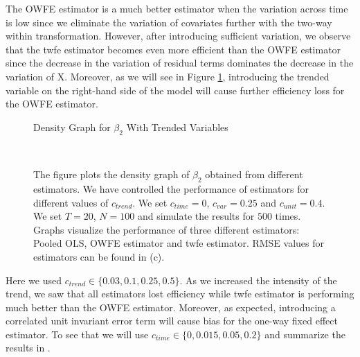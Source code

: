 \documentclass[12pt, a4paper]{article}
\begin{document}
The \ac{OWFE} estimator is a much better estimator when the variation
across time is low since we eliminate the variation of covariates
further with the two-way within transformation.
However, after introducing sufficient variation, we observe that the \ac{twfe} estimator becomes even more
efficient than the \ac{OWFE} estimator since the decrease in the variation of residual terms dominates the decrease in the variation of X. Moreover, as we will see in Figure \ref{fig:c3},
introducing the trended variable on the right-hand side of the model will cause further efficiency loss for the \ac{OWFE} estimator.
\begin{figure}[t]
    \caption{Density Graph for $\beta_2$ With Trended Variables}
     \\
    \caption*{\scriptsize{The figure plots the density graph of $\beta_2$
    obtained from different estimators. We have controlled the performance of
    estimators for different values of $c_{trend}$. We set $c_{time} = 0$, $c_{var} = 0.25$
    and $c_{unit} = 0.4$. We set $T = 20$, $N = 100$ and simulate the results
    for $500$ times. Graphs visualize the performance
    of three different estimators: Pooled OLS, \ac{OWFE} estimator and
    \ac{twfe} estimator. RMSE values for estimators can be found in  (c).
    \label{fig:c3}
    }}
\end{figure}
Here we used $c_{trend} \in \{0.03, 0.1, 0.25, 0.5\}$.  As we increased the intensity of the trend, we saw that all estimators lost efficiency while
\ac{twfe} estimator is performing much better than the \ac{OWFE} estimator.
Moreover, as expected, introducing a correlated unit invariant error term will cause bias for the one-way fixed effect estimator.
To see that we will use $c_{time} \in \{0, 0.015, 0.05, 0.2\}$ and summarize the results in .
\end{document}
